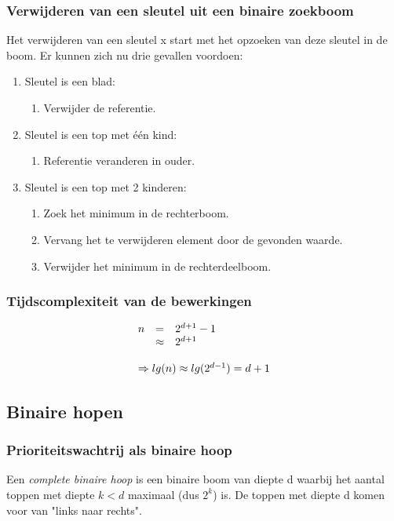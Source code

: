 \documentclass[a4paper,12pt]{article}
\begin{document}
\subsubsection{Verwijderen van een sleutel uit een binaire zoekboom}
Het verwijderen van een sleutel x start met het opzoeken van deze sleutel in de boom.
Er kunnen zich nu drie gevallen voordoen:
\begin{enumerate}
\item Sleutel is een blad:
	\begin{enumerate}
	\item Verwijder de referentie.
	\end{enumerate}
\item Sleutel is een top met één kind:
	\begin{enumerate}
	\item Referentie veranderen in ouder.
	\end{enumerate}
\item Sleutel is een top met 2 kinderen:
	\begin{enumerate}
	\item Zoek het minimum in de rechterboom.
	\item Vervang het te verwijderen element door de gevonden waarde.
	\item Verwijder het minimum in de rechterdeelboom.
	\end{enumerate}
\end{enumerate}

\subsubsection{Tijdscomplexiteit van de bewerkingen}
\begin{equation}
\begin{array}{r c l}
n & = & 2^{d+1}-1\\
& \approx & 2^{d+1}\\
&&\\
\multicolumn{3}{l}{\Rightarrow lg(n) \approx lg(2^{d-1})=d+1} 
\end{array}
\end{equation}

\subsection{Binaire hopen}
\subsubsection{Prioriteitswachtrij als binaire hoop}
Een \textit{complete binaire hoop} is een binaire boom van diepte d waarbij het aantal toppen met diepte $k < d$ maximaal (dus $2^k$) is.
De toppen met diepte d komen voor van "links naar rechts".
\end{document}
